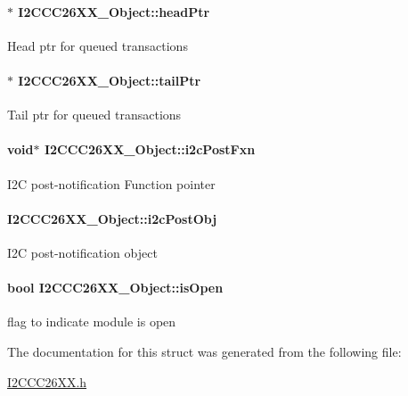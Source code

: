 \paragraph[{head\+Ptr}]{$\ast$ I2\+C\+C\+C26\+X\+X\+\_\+\+Object\+::head\+Ptr}\label{struct_i2_c_c_c26_x_x___object_a7148eed6e39ab2ab626c53030c7b77bb}
Head ptr for queued transactions 
\paragraph[{tail\+Ptr}]{$\ast$ I2\+C\+C\+C26\+X\+X\+\_\+\+Object\+::tail\+Ptr}\label{struct_i2_c_c_c26_x_x___object_a6cd1216ab6faa1e951186dfe696f841b}
Tail ptr for queued transactions 
\paragraph[{i2c\+Post\+Fxn}]{\setlength{\rightskip}{0pt plus 5cm}void$\ast$ I2\+C\+C\+C26\+X\+X\+\_\+\+Object\+::i2c\+Post\+Fxn}\label{struct_i2_c_c_c26_x_x___object_a6a7aaccb2b2b05d9fd9230924acf9e96}
I2\+C post-\/notification Function pointer 
\paragraph[{i2c\+Post\+Obj}]{ I2\+C\+C\+C26\+X\+X\+\_\+\+Object\+::i2c\+Post\+Obj}\label{struct_i2_c_c_c26_x_x___object_a2b16c813ec8f21896de5eecf03ed4178}
I2\+C post-\/notification object 
\paragraph[{is\+Open}]{\setlength{\rightskip}{0pt plus 5cm}bool I2\+C\+C\+C26\+X\+X\+\_\+\+Object\+::is\+Open}\label{struct_i2_c_c_c26_x_x___object_a4c74297d4652d9f61558ca4099867686}
flag to indicate module is open 

The documentation for this struct was generated from the following file\+:\begin{DoxyCompactItemize}
\item 
\hyperlink{_i2_c_c_c26_x_x_8h}{I2\+C\+C\+C26\+X\+X.\+h}\end{DoxyCompactItemize}
